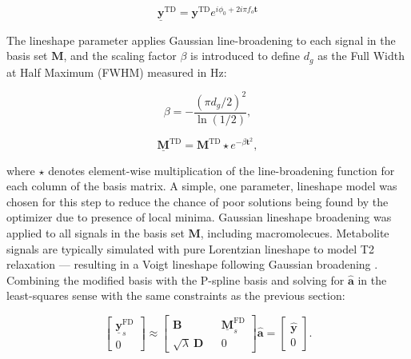 \documentclass[num-refs]{wiley-article}
\begin{document}
\begin{equation}
    \underline{\mathbf{y}}^{\mathrm{TD}} = \mathbf{y}^{\mathrm{TD}} e^{i \phi_{0} + 2 i \pi f_{o} \mathbf{t}}
\end{equation}

The lineshape parameter applies Gaussian line-broadening to each signal in the basis set $\mathbf{M}$, and the scaling factor $\beta$ is introduced to define $d_{g}$ as the Full Width at Half Maximum (FWHM) measured in Hz:

\begin{equation}
    \beta = -\frac{{(\pi d_{g} / 2)}^{2}}{\ln(1/2)},
\end{equation}

\begin{equation}
    \underline{\mathbf{M}}^{\mathrm{TD}} = \mathbf{M}^{\mathrm{TD}} \star e^{-\beta \mathbf{t}^{2}},
\end{equation}

where $\star$ denotes element-wise multiplication of the line-broadening function for each column of the basis matrix. A simple, one parameter, lineshape model was chosen for this step to reduce the chance of poor solutions being found by the optimizer due to presence of local minima. Gaussian lineshape broadening was applied to all signals in the basis set $\textbf{M}$, including macromolecues. Metabolite signals are typically simulated with pure Lorentzian lineshape to model T2 relaxation --- resulting in a Voigt lineshape following Gaussian broadening \cite{Marshall1997}. Combining the modified basis with the P-spline basis and solving for $\hat{\mathbf{a}}$ in the least-squares sense with the same constraints as the previous section:

\begin{equation}
  \begin{bmatrix}
      \underline{\textbf{y}}^{\mathrm{FD}}_{s} \\ 0
  \end{bmatrix}
  \approx
  \begin{bmatrix}
      \textbf{B} && \underline{\textbf{M}}^{\mathrm{FD}}_{s} \\ \sqrt{\lambda} \ \textbf{D} && 0
  \end{bmatrix} \hat{\mathbf{a}} =
  \begin{bmatrix}
    \hat{\textbf{y}} \\ 0
  \end{bmatrix}.
  \label{linear_fit}
\end{equation}
\end{document}
